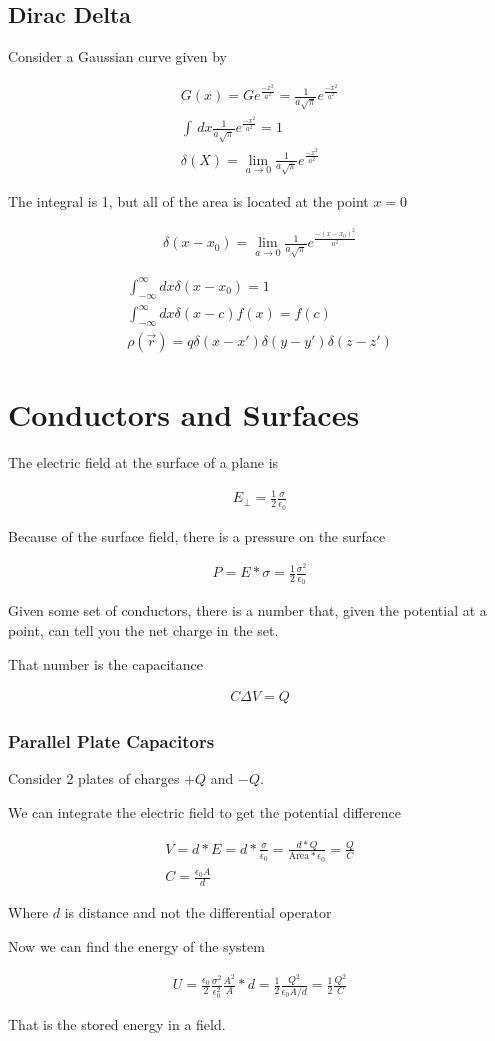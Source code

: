 \documentclass[fleqn]{report}
\newcommand{\equations} [1] {
\begin{gather*}
#1
\end{gather*}
}
\begin{document}
\section{Dirac Delta}
Consider a Gaussian curve given by 
\equations{
    G(x) = Ge^{\frac{-x^2}{a^2}}
    =
    \frac{1}{a \sqrt{\pi}} e^{\frac{-x^2}{a^2}}
    \\
    \int \, dx
    \frac{1}{a \sqrt{\pi}} e^{\frac{-x^2}{a^2}}
    = 1
    \\
    \delta(X) = 
    \lim_{a \to 0}
    \frac{1}{a \sqrt{\pi}} e^{\frac{-x^2}{a^2}}
}
The integral is 1, but all of the area is located at the point $x = 0$
\equations{
    \delta(x - x_0) =
    \lim_{a \to 0}
    \frac{1}{a \sqrt{\pi}} e^{\frac{-(x - x_0)^2}{a^2}}
}
\equations{
    \int^{\infty}_{-\infty}
    dx \delta(x - x_0)
    = 1
    \\
    \int^{\infty}_{-\infty}
    dx \delta(x - c) f(x)
    = f(c)
    \\
    \rho(\vec r) = q \delta(x - x') \delta(y - y') \delta(z - z')
}

\chapter{Conductors and Surfaces}
The electric field at the surface of a plane is 
\equations{
    E_{\perp} = \frac{1}{2} \frac{\sigma}{\epsilon_0}
}
Because of the surface field, there is a pressure on the surface 
\equations{
    P = E * \sigma = \frac{1}{2} \frac{\sigma^2}{\epsilon_0}
}

Given some set of conductors, there is a number that, given the potential 
at a point, can tell you the net charge in the set. 

That number is the capacitance
\equations{
    C \Delta V = Q 
}

\subsection{Parallel Plate Capacitors}
Consider 2 plates of charges $+Q$ and $-Q$. 

We can integrate the electric field to get the potential difference 
\equations{
    V = d * E = d * \frac{\sigma}{\epsilon_0}
    =
    \frac{d * Q}{\textrm{Area} * \epsilon_0} = \frac{Q}{C}
    \\
    C = \frac{\epsilon_0 A}{d}
}
Where $d$ is distance and not the differential operator

Now we can find the energy of the system 
\equations{
    U = 
    \frac{\epsilon_0}{2} 
    \frac{\sigma^2}{\epsilon_0^2}
    \frac{A^2}{A} * d
    =
    \frac{1}{2} \frac{Q^2}{\epsilon_0 A/d} 
    =
    \frac{1}{2} \frac{Q^2}{C}
}
That is the stored energy in a field. 
\end{document}
